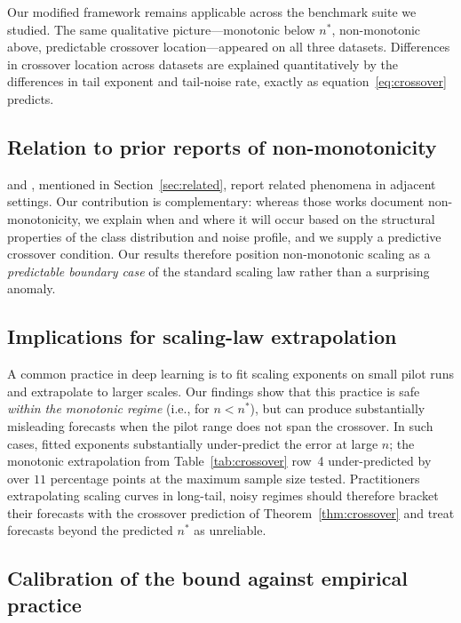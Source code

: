 \documentclass[11pt]{article}
\begin{document}
Our modified framework remains applicable across the benchmark suite we studied. The same qualitative picture---monotonic below $n^{*}$, non-monotonic above, predictable crossover location---appeared on all three datasets. Differences in crossover location across datasets are explained quantitatively by the differences in tail exponent and tail-noise rate, exactly as equation~\eqref{eq:crossover} predicts.

\subsection{Relation to prior reports of non-monotonicity}

\citet{hassani2024} and \citet{bjornstad2024}, mentioned in Section~\ref{sec:related}, report related phenomena in adjacent settings. Our contribution is complementary: whereas those works document non-monotonicity, we explain when and where it will occur based on the structural properties of the class distribution and noise profile, and we supply a predictive crossover condition. Our results therefore position non-monotonic scaling as a \emph{predictable boundary case} of the standard scaling law rather than a surprising anomaly.

\subsection{Implications for scaling-law extrapolation}

A common practice in deep learning is to fit scaling exponents on small pilot runs and extrapolate to larger scales. Our findings show that this practice is safe \emph{within the monotonic regime} (i.e., for $n < n^{*}$), but can produce substantially misleading forecasts when the pilot range does not span the crossover. In such cases, fitted exponents substantially under-predict the error at large $n$; the monotonic extrapolation from Table~\ref{tab:crossover} row~4 under-predicted by over $11$ percentage points at the maximum sample size tested. Practitioners extrapolating scaling curves in long-tail, noisy regimes should therefore bracket their forecasts with the crossover prediction of Theorem~\ref{thm:crossover} and treat forecasts beyond the predicted $n^{*}$ as unreliable.

\subsection{Calibration of the bound against empirical practice}
\end{document}
